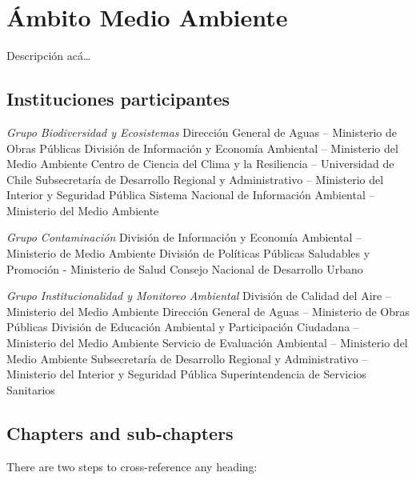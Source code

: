 \documentclass[
]{book}
\theoremstyle{definition}
\theoremstyle{definition}
\theoremstyle{definition}
\theoremstyle{definition}
\theoremstyle{remark}
\begin{document}
\hypertarget{uxe1mbito-medio-ambiente}{%
\chapter{Ámbito Medio Ambiente}\label{uxe1mbito-medio-ambiente}}

Descripción acá\ldots{}

\hypertarget{instituciones-participantes-1}{%
\section*{Instituciones participantes}\label{instituciones-participantes-1}}

\emph{Grupo Biodiversidad y Ecosistemas}
Dirección General de Aguas -- Ministerio de Obras Públicas
División de Información y Economía Ambiental -- Ministerio del Medio Ambiente
Centro de Ciencia del Clima y la Resiliencia -- Universidad de Chile
Subsecretaría de Desarrollo Regional y Administrativo -- Ministerio del Interior y Seguridad Pública
Sistema Nacional de Información Ambiental -- Ministerio del Medio Ambiente

\emph{Grupo Contaminación}
División de Información y Economía Ambiental -- Ministerio de Medio Ambiente
División de Políticas Públicas Saludables y Promoción - Ministerio de Salud
Consejo Nacional de Desarrollo Urbano

\emph{Grupo Institucionalidad y Monitoreo Ambiental}
División de Calidad del Aire -- Ministerio del Medio Ambiente
Dirección General de Aguas -- Ministerio de Obras Públicas
División de Educación Ambiental y Participación Ciudadana -- Ministerio del Medio Ambiente
Servicio de Evaluación Ambiental -- Ministerio del Medio Ambiente
Subsecretaría de Desarrollo Regional y Administrativo -- Ministerio del Interior y Seguridad Pública
Superintendencia de Servicios Sanitarios

\hypertarget{chapters-and-sub-chapters}{%
\section*{Chapters and sub-chapters}\label{chapters-and-sub-chapters}}

There are two steps to cross-reference any heading:
\end{document}
